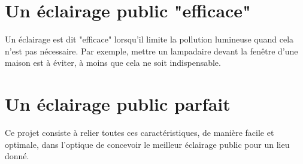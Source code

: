\section{Un \'eclairage public "efficace"}



Un \'eclairage est dit "efficace" lorsqu'il limite la pollution lumineuse quand cela n'est pas n\'ecessaire. Par exemple, mettre un lampadaire devant la fen\^etre d'une maison est \`a \'eviter, à moins que cela ne soit indispensable.




\section{Un \'eclairage public parfait}


Ce projet consiste \`a relier toutes ces caract\'eristiques, de manière facile et optimale, dans l'optique de concevoir le meilleur \'eclairage public pour un lieu donn\'e.